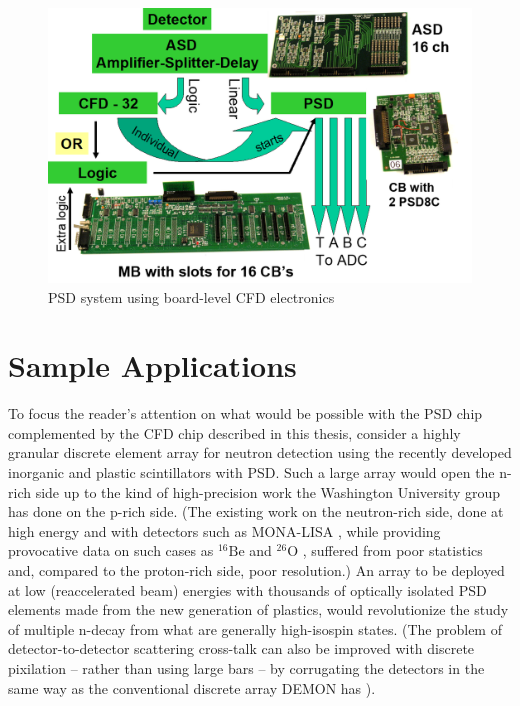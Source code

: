 \documentclass[12pt,oneside,final]{siuethesis}
\theoremstyle{definition}
\begin{document}
\begin{figure}[htbp!]
	\centering
 	\includegraphics[scale=0.8,keepaspectratio=true]{./ch1_figures/PSD_system.png}
 	\caption{PSD system using board-level CFD electronics}
 	\label{FIG:PSD_SYSTEM}
\end{figure}



\section{Sample Applications}

To focus the reader's attention on what would be possible with the PSD chip complemented by the CFD chip described in this thesis, consider a highly granular discrete element array for neutron detection using the recently developed inorganic \cite{BUDDEN} and plastic \cite{ZAITSEVA} scintillators with PSD. Such a large array would open the n-rich side up to the kind of high-precision work the Washington University group has done on the p-rich side. (The existing work on the neutron-rich side, done at high energy and with detectors such as MONA-LISA \cite{BAUMANNA}, while providing provocative data on such cases as $^{16}\mathrm{Be}$ \cite{SPYROU} and $^{26}\mathrm{O}$ \cite{KOHLEY}, suffered from poor statistics and, compared to the proton-rich side, poor resolution.) An array to be deployed at low (reaccelerated beam) energies with thousands of optically isolated PSD elements made from the new generation of plastics, would revolutionize the study of multiple n-decay from what are generally high-isospin states. (The problem of detector-to-detector scattering cross-talk can also be improved with discrete pixilation – rather than using large bars – by corrugating the detectors in the same way as the conventional discrete array DEMON has \cite{TILQUIN}).  
\end{document}
